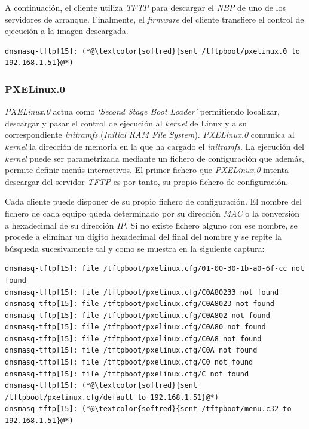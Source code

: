 \documentclass[a4paper,12pt,spanish,final]{epsc_tfc_pfc}
\begin{document}
A continuación, el cliente utiliza \emph{TFTP} para descargar el \emph{NBP} de uno de los servidores de arranque. Finalmente, el \emph{firmware} del cliente transfiere el control de ejecución a la imagen descargada.\\

\begin{lstlisting}[style=dnsmasq]
dnsmasq-tftp[15]: (*@\textcolor{softred}{sent /tftpboot/pxelinux.0 to 192.168.1.51}@*)
\end{lstlisting}

\subsubsection{PXELinux.0}
\emph{PXELinux.0} actua como \emph{`Second Stage Boot Loader'} permitiendo localizar, descargar y pasar el control de ejecución al \emph{kernel} de Linux y a su correspondiente \emph{initramfs} (\emph{Initial RAM File System}). \emph{PXELinux.0} comunica al \emph{kernel} la dirección de memoria en la que ha cargado el \emph{initramfs}. La ejecución del \emph{kernel} puede ser parametrizada mediante un fichero de configuración que además, permite definir menús interactivos. El primer fichero que \emph{PXELinux.0} intenta descargar del servidor \emph{TFTP} es por tanto, su propio fichero de configuración.

Cada cliente puede disponer de su propio fichero de configuración. El nombre del fichero de cada equipo queda determinado por su dirección \emph{MAC} o la conversión a hexadecimal de su dirección \emph{IP}. Si no existe fichero alguno con ese nombre, se procede a eliminar un dígito hexadecimal del final del nombre y se repite la búsqueda sucesivamente tal y como se muestra en la siguiente captura:\\

\begin{lstlisting}[style=dnsmasq]
dnsmasq-tftp[15]: file /tftpboot/pxelinux.cfg/01-00-30-1b-a0-6f-cc not found
dnsmasq-tftp[15]: file /tftpboot/pxelinux.cfg/C0A80233 not found
dnsmasq-tftp[15]: file /tftpboot/pxelinux.cfg/C0A8023 not found
dnsmasq-tftp[15]: file /tftpboot/pxelinux.cfg/C0A802 not found
dnsmasq-tftp[15]: file /tftpboot/pxelinux.cfg/C0A80 not found
dnsmasq-tftp[15]: file /tftpboot/pxelinux.cfg/C0A8 not found
dnsmasq-tftp[15]: file /tftpboot/pxelinux.cfg/C0A not found
dnsmasq-tftp[15]: file /tftpboot/pxelinux.cfg/C0 not found
dnsmasq-tftp[15]: file /tftpboot/pxelinux.cfg/C not found
dnsmasq-tftp[15]: (*@\textcolor{softred}{sent /tftpboot/pxelinux.cfg/default to 192.168.1.51}@*)
dnsmasq-tftp[15]: (*@\textcolor{softred}{sent /tftpboot/menu.c32 to 192.168.1.51}@*)
\end{lstlisting}
\end{document}
